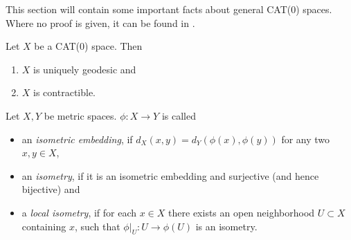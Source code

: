 
This section will contain some important facts about general CAT(0) spaces. Where no proof is given, it can be found in \cite{MR1744486}.

\begin{prop}[{\cite[Prop II.1.4]{MR1744486}}]
  Let \(X\) be a CAT(0) space. Then
  \begin{enumerate}
  \item \(X\) is uniquely geodesic and
  \item \(X\) is contractible.
  \end{enumerate}
\end{prop}

\begin{defin}
  Let \(X,Y\) be metric spaces. \(\phi \colon X \to Y\) is called
  \begin{itemize}
  \item an \emph{isometric embedding}, if \(d_X(x,y) = d_Y(\phi(x), \phi(y))\) for any two \(x,y \in X\),
  \item an \emph{isometry}, if it is an isometric embedding and surjective (and hence bijective) and
  \item a \emph{local isometry}, if for each \(x \in X\) there exists an open neighborhood \(U \subset X\) containing \(x\), such that \(\phi|_U \colon U \to \phi(U)\) is an isometry.
  \end{itemize}
\end{defin}


